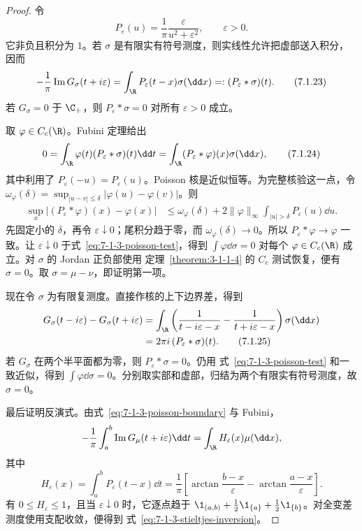 \begin{proof}
令
\[
 P_\varepsilon(u)=\frac1\pi\frac{\varepsilon}{u^2+\varepsilon^2},
 \qquad \varepsilon>0.
\]
它非负且积分为 $1$。若 $\sigma$ 是有限实有符号测度，则实线性允许把虚部送入积分，因而
\[
 -\frac1\pi\operatorname{Im}G_\sigma(t+i\varepsilon)
 =\int_\R P_\varepsilon(t-x)\sigma(\dd x)
 =:(P_\varepsilon*\sigma)(t).
 \tag{7.1.23}\label{eq:7-1-3-poisson-boundary}
\]
若 $G_\sigma=0$ 于 $\C_+$，则 $P_\varepsilon*\sigma=0$ 对所有 $\varepsilon>0$ 成立。

取 $\varphi\in C_c(\R)$。Fubini 定理给出
\[
 0=\int_\R\varphi(t)(P_\varepsilon*\sigma)(t)\dd t
  =\int_\R(P_\varepsilon*\varphi)(x)\sigma(\dd x),
 \tag{7.1.24}\label{eq:7-1-3-poisson-test}
\]
其中利用了 $P_\varepsilon(-u)=P_\varepsilon(u)$。Poisson 核是近似恒等。为完整核验这一点，令
$\omega_\varphi(\delta)=\sup_{|u-v|\le\delta}|\varphi(u)-\varphi(v)|$。则
\begin{align*}
 \sup_x|(P_\varepsilon*\varphi)(x)-\varphi(x)|
 &\le \omega_\varphi(\delta)
 +2\|\varphi\|_\infty
   \int_{|u|>\delta}P_\varepsilon(u)\dd u.
\end{align*}
先固定小的 $\delta$，再令 $\varepsilon\downarrow0$；尾积分趋于零，而
$\omega_\varphi(\delta)\to0$。所以 $P_\varepsilon*\varphi\to\varphi$ 一致。让
$\varepsilon\downarrow0$ 于式~\eqref{eq:7-1-3-poisson-test}，得到
$\int\varphi\dd\sigma=0$ 对每个 $\varphi\in C_c(\R)$ 成立。对 $\sigma$ 的 Jordan 正负部使用
定理~\ref{theorem:3-1-1-4} 的 $C_c$ 测试恢复，便有 $\sigma=0$。取
$\sigma=\mu-\nu$，即证明第一项。

现在令 $\sigma$ 为有限复测度。直接作核的上下边界差，得到
\begin{align*}
 G_\sigma(t-i\varepsilon)-G_\sigma(t+i\varepsilon)
 &=\int_\R\left(\frac1{t-i\varepsilon-x}
                 -\frac1{t+i\varepsilon-x}\right)\sigma(\dd x)\\
 &=2\pi i\,(P_\varepsilon*\sigma)(t).
 \tag{7.1.25}\label{eq:7-1-3-two-sided-jump}
\end{align*}
若 $G_\sigma$ 在两个半平面都为零，则 $P_\varepsilon*\sigma=0$。仍用
式~\eqref{eq:7-1-3-poisson-test} 和一致近似，得到
$\int\varphi\dd\sigma=0$。分别取实部和虚部，归结为两个有限实有符号测度，故 $\sigma=0$。

最后证明反演式。由式~\eqref{eq:7-1-3-poisson-boundary} 与 Fubini，
\[
 -\frac1\pi\int_a^b\operatorname{Im}G_\mu(t+i\varepsilon)\dd t
 =\int_\R H_\varepsilon(x)\mu(\dd x),
\]
其中
\[
 H_\varepsilon(x)
 =\int_a^bP_\varepsilon(t-x)\dd t
 =\frac1\pi\left[
   \arctan\frac{b-x}{\varepsilon}
  -\arctan\frac{a-x}{\varepsilon}\right].
\]
有 $0\le H_\varepsilon\le1$，且当 $\varepsilon\downarrow0$ 时，它逐点趋于
$\1_{(a,b)}+\tfrac12\1_{\{a\}}+\tfrac12\1_{\{b\}}$。对全变差测度使用支配收敛，便得到
式~\eqref{eq:7-1-3-stieltjes-inversion}。
\end{proof}

